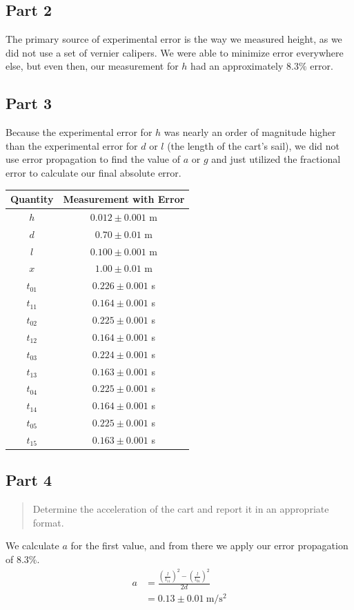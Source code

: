 \documentclass[10pt]{extarticle}
\newcommand{\plain}[1]{\textrm{#1}}
\begin{document}
{\subsection*{Part 2}
The primary source of experimental error is the way we measured height, as we did not use a set of vernier calipers. We were able to minimize error everywhere else, but even then, our measurement for $h$ had an approximately $8.3\%$ error.
\subsection*{Part 3}
Because the experimental error for $h$ was nearly an order of magnitude higher than the experimental error for $d$ or $l$ (the length of the cart's sail), we did not use error propagation to find the value of $a$ or $g$ and just utilized the fractional error to calculate our final absolute error.
\begin{center}
	\begin{tabular}{c|c}
		Quantity & Measurement with Error \\
		\hline
		$h$ & $0.012\pm 0.001$ m\\
		$d$ & $0.70 \pm 0.01$ m \\
		$l$ & $0.100 \pm 0.001$ m \\
		$x$ & $1.00 \pm 0.01$ m \\
		\hline
		$t_{01}$ & $0.226 \pm 0.001$ s \\
		$t_{11}$ & $0.164 \pm 0.001$ s \\
		$t_{02}$ & $0.225 \pm 0.001$ s \\
		$t_{12}$ & $0.164 \pm 0.001$ s \\
		$t_{03}$ & $0.224 \pm 0.001$ s \\
		$t_{13}$ & $0.163 \pm 0.001$ s \\
		$t_{04}$ & $0.225 \pm 0.001$ s \\
		$t_{14}$ & $0.164 \pm 0.001$ s \\
		$t_{05}$ & $0.225 \pm 0.001$ s \\
		$t_{15}$ & $0.163 \pm 0.001$ s
	\end{tabular}
\end{center}
\subsection*{Part 4}
\begin{quote}
	Determine the acceleration of the cart and report it in an appropriate format.
\end{quote}
We calculate $a$ for the first value, and from there we apply our error propagation of $8.3\%$.
\begin{align*}
	a &= \frac{\left(\frac{l}{t_{11}}\right)^2 - \left(\frac{l}{t_{01}}\right)^2}{2d} \\
	&= 0.13\pm 0.01~\plain{m/s$^{2}$} \\
\end{align*}
}
\end{document}
